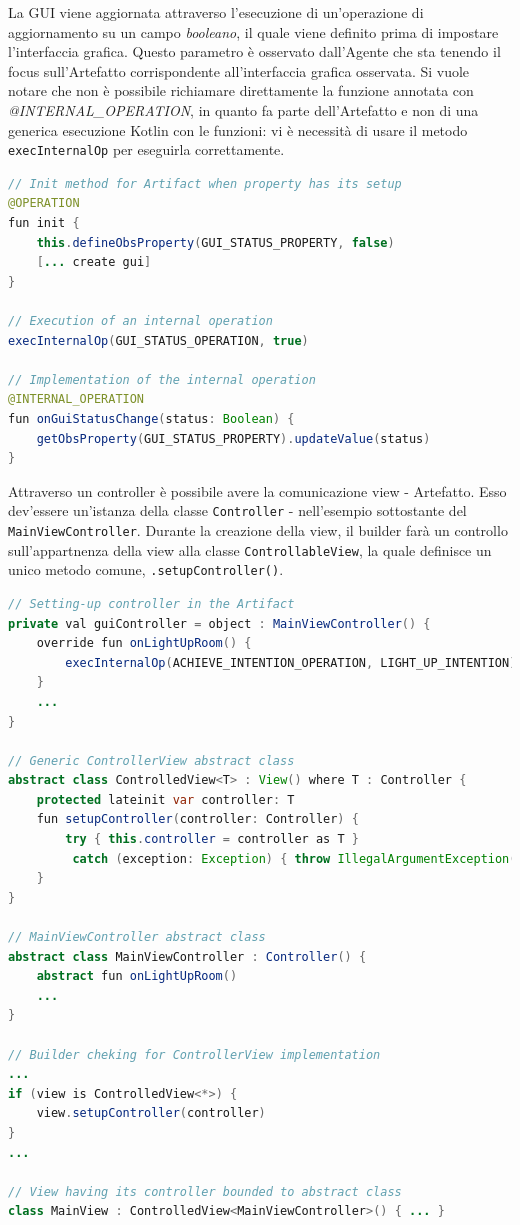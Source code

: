 \documentclass[12pt,a4paper,openright,oneside]{report}
\begin{document}
La GUI viene aggiornata attraverso l'esecuzione di un'operazione di aggiornamento su un campo \textit{booleano}, il quale viene definito prima di impostare l'interfaccia grafica. Questo parametro è osservato dall'Agente che sta tenendo il focus sull'Artefatto corrispondente all'interfaccia grafica osservata. Si vuole notare che non è possibile richiamare direttamente la funzione annotata con \textit{@INTERNAL\_OPERATION}, in quanto fa parte dell'Artefatto e non di una generica esecuzione Kotlin con le funzioni: vi è necessità di usare il metodo \texttt{execInternalOp} per eseguirla correttamente.

\begin{lstlisting}[language=Java]
// Init method for Artifact when property has its setup
@OPERATION
fun init {
	this.defineObsProperty(GUI_STATUS_PROPERTY, false)
	[... create gui]
}

// Execution of an internal operation
execInternalOp(GUI_STATUS_OPERATION, true)

// Implementation of the internal operation
@INTERNAL_OPERATION
fun onGuiStatusChange(status: Boolean) {
	getObsProperty(GUI_STATUS_PROPERTY).updateValue(status)
}
\end{lstlisting}

Attraverso un controller è possibile avere la comunicazione view - Artefatto. Esso dev'essere un'istanza della classe \texttt{Controller} - nell'esempio sottostante del \texttt{MainViewController}. Durante la creazione della view, il builder farà un controllo sull'appartnenza della view alla classe \texttt{ControllableView}, la quale definisce un unico metodo comune, \texttt{.setupController()}.

\begin{lstlisting}[language=Java, label=lst:view_artifact]
// Setting-up controller in the Artifact
private val guiController = object : MainViewController() {
	override fun onLightUpRoom() {
		execInternalOp(ACHIEVE_INTENTION_OPERATION, LIGHT_UP_INTENTION)
	}
	...
}

// Generic ControllerView abstract class
abstract class ControlledView<T> : View() where T : Controller {
	protected lateinit var controller: T
	fun setupController(controller: Controller) {
		try { this.controller = controller as T }
		 catch (exception: Exception) { throw IllegalArgumentException("Controller is not of requested type!") }
	}
}

// MainViewController abstract class
abstract class MainViewController : Controller() {
	abstract fun onLightUpRoom()
	...
}

// Builder cheking for ControllerView implementation
...
if (view is ControlledView<*>) {
	view.setupController(controller)
}
...

// View having its controller bounded to abstract class
class MainView : ControlledView<MainViewController>() { ... }
\end{lstlisting}
\end{document}

